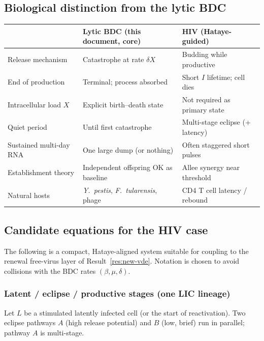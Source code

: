 \documentclass[11pt,a4paper]{article}
\theoremstyle{plain}
\theoremstyle{definition}
\theoremstyle{remark}
\begin{document}
\subsection{Biological distinction from the lytic BDC}

\begin{center}
\renewcommand{\arraystretch}{1.25}
\begin{tabular}{@{}lll@{}}
\toprule
 & Lytic BDC (this document, core) & HIV (Hataye-guided) \\
\midrule
Release mechanism & Catastrophe at rate $\delta X$ & Budding while productive \\
End of production & Terminal; process absorbed & Short $I$ lifetime; cell dies \\
Intracellular load $X$ & Explicit birth--death state & Not required as primary state \\
Quiet period & Until first catastrophe & Multi-stage eclipse (+ latency) \\
Sustained multi-day RNA & One large dump (or nothing) & Often staggered short pulses \\
Establishment theory & Independent offspring OK as baseline & Allee synergy near threshold \\
Natural hosts & \textit{Y.\ pestis}, \textit{F.\ tularensis}, phage & CD4 T cell latency / rebound \\
\bottomrule
\end{tabular}
\end{center}

\subsection{Candidate equations for the HIV case}
\label{sec:hiv-eqns}

The following is a compact, Hataye-aligned system suitable for coupling to the
renewal free-virus layer of Result~\ref{res:new-vde}. Notation is chosen to
avoid collisions with the BDC rates $(\beta,\mu,\delta)$.

\subsubsection*{Latent / eclipse / productive stages (one LIC lineage)}

Let $L$ be a stimulated latently infected cell (or the start of reactivation).
Two eclipse pathways $A$ (high release potential) and $B$ (low, brief) run in
parallel; pathway $A$ is multi-stage.
\end{document}
